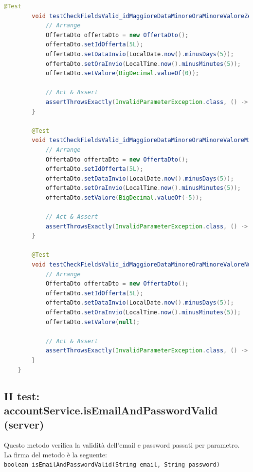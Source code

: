 \begin{lstlisting}[language=Java, caption=OffertaServiceTests.java]
        @Test
        void testCheckFieldsValid_idMaggioreDataMinoreOraMinoreValoreZero() {
            // Arrange
            OffertaDto offertaDto = new OffertaDto();
            offertaDto.setIdOfferta(5L);
            offertaDto.setDataInvio(LocalDate.now().minusDays(5));
            offertaDto.setOraInvio(LocalTime.now().minusMinutes(5));
            offertaDto.setValore(BigDecimal.valueOf(0));
    
            // Act & Assert
            assertThrowsExactly(InvalidParameterException.class, () -> offertaService.checkFieldsValid(offertaDto));
        }
    
        @Test
        void testCheckFieldsValid_idMaggioreDataMinoreOraMinoreValoreMinore() {
            // Arrange
            OffertaDto offertaDto = new OffertaDto();
            offertaDto.setIdOfferta(5L);
            offertaDto.setDataInvio(LocalDate.now().minusDays(5));
            offertaDto.setOraInvio(LocalTime.now().minusMinutes(5));
            offertaDto.setValore(BigDecimal.valueOf(-5));
    
            // Act & Assert
            assertThrowsExactly(InvalidParameterException.class, () -> offertaService.checkFieldsValid(offertaDto));
        }
    
        @Test
        void testCheckFieldsValid_idMaggioreDataMinoreOraMinoreValoreNull() {
            // Arrange
            OffertaDto offertaDto = new OffertaDto();
            offertaDto.setIdOfferta(5L);
            offertaDto.setDataInvio(LocalDate.now().minusDays(5));
            offertaDto.setOraInvio(LocalTime.now().minusMinutes(5));
            offertaDto.setValore(null);
    
            // Act & Assert
            assertThrowsExactly(InvalidParameterException.class, () -> offertaService.checkFieldsValid(offertaDto));
        }
    }
            \end{lstlisting}
        

        \subsection{II test:  accountService.isEmailAndPasswordValid (server)}
            Questo metodo verifica la validità dell'email e password passati per parametro. \\
            
            \noindent La firma del metodo è la seguente:\\
            \texttt{boolean isEmailAndPasswordValid(String email, String password)} \\
            
